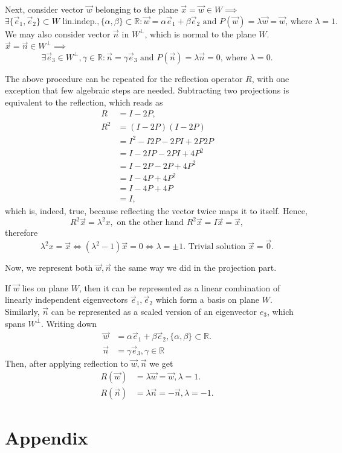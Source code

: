 \documentclass{article}
\begin{document}
Next, consider vector $\vec{w}$ belonging to the plane $\vec{x}=\vec{w}\in W\implies$
\begin{equation*}
	\exists \{\vec{e}_1,\vec{e}_2\}\subset W \text{ lin.indep.}, \{\alpha,\beta\}\subset \mathbb{R}:\vec{w}=\alpha\vec{e}_1+\beta\vec{e}_2\text{ and }P(\vec{w})=\lambda\vec{w}=\vec{w}\text{, where }\lambda=1.
\end{equation*}
We may also consider vector $\vec{n}$ in $W^\perp$, which is normal to the plane $W$. $\vec{x}=\vec{n}\in W^\perp\implies$
\begin{equation*}
	\exists \vec{e}_3\in W^\perp, \gamma \in \mathbb{R}:\vec{n}=\gamma \vec{e}_3\text{ and }P(\vec{n})=\lambda\vec{n}=0\text{, where }\lambda=0.	
\end{equation*}

The above procedure can be repeated for the reflection operator $R$, with one exception that few algebraic steps are needed. Subtracting two projections is equivalent to the reflection, which reads as
\begin{align*}
	R 	&=I-2P,\\
	R^2 &=(I-2P)(I-2P)\\
		&=I^2-I2P-2PI+2P2P\\
		&=I-2IP-2PI+4P^2\\
		&=I-2P-2P+4P^2\\
		&=I-4P+4P^2\\
		&=I-4P+4P\\
		&=I,
\end{align*}
which is, indeed, true, because reflecting the vector twice maps it to itself. Hence,
\begin{equation*}
	R^2\vec{x}=\lambda^2{x},\text{ on the other hand } R^2\vec{x}=I\vec{x}=\vec{x},
\end{equation*}
therefore
\begin{equation*}
	\lambda^2{x}=\vec{x}\iff\left(\lambda^2-1\right)\vec{x}=0\iff\lambda=\pm1.\text{ Trivial solution }\vec{x}=\vec{0}.
\end{equation*}

Now, we represent both $\vec{w},\vec{n}$ the same way we did in the projection part. 

If $\vec{w}$ lies on plane $W$, then it can be represented as a linear combination of linearly independent eigenvectors $\vec{e}_1,\vec{e}_2$ which form a basis on plane $W$. Similarly, $\vec{n}$ can be represented as a scaled version of an eigenvector $e_3$, which spans $W^\perp$. Writing down
\begin{align*}
	\vec{w}&=\alpha\vec{e}_1+\beta\vec{e}_2,\{\alpha,\beta\}\subset \mathbb{R}.\\
	\vec{n}&=\gamma\vec{e}_3,\gamma\in\mathbb{R}
\end{align*}
Then, after applying reflection to $\vec{w},\vec{n}$ we get
\begin{align*}
	R(\vec{w})&=\lambda\vec{w}=\vec{w},\lambda=1.\\
	R(\vec{n})&=\lambda\vec{n}=-\vec{n},\lambda=-1.
\end{align*}






\appendix

\section{Appendix}
\end{document}
